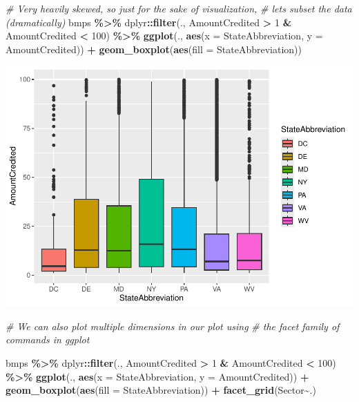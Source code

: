 \documentclass[]{article}
\newenvironment{Shaded}{\begin{snugshade}}{\end{snugshade}}
\newcommand{\AttributeTok}[1]{\textcolor[rgb]{0.13,0.29,0.53}{#1}}
\newcommand{\CommentTok}[1]{\textcolor[rgb]{0.56,0.35,0.01}{\textit{#1}}}
\newcommand{\DecValTok}[1]{\textcolor[rgb]{0.00,0.00,0.81}{#1}}
\newcommand{\FunctionTok}[1]{\textcolor[rgb]{0.13,0.29,0.53}{\textbf{#1}}}
\newcommand{\NormalTok}[1]{#1}
\newcommand{\SpecialCharTok}[1]{\textcolor[rgb]{0.81,0.36,0.00}{\textbf{#1}}}
\begin{document}
\begin{Shaded}
\begin{Highlighting}[]
\CommentTok{\# Very heavily skewed, so just for the sake of visualization, }
\CommentTok{\# let\textquotesingle{}s subset the data (dramatically)}
\NormalTok{bmps }\SpecialCharTok{\%\textgreater{}\%} 
\NormalTok{  dplyr}\SpecialCharTok{::}\FunctionTok{filter}\NormalTok{(., AmountCredited }\SpecialCharTok{\textgreater{}} \DecValTok{1} \SpecialCharTok{\&}\NormalTok{ AmountCredited }\SpecialCharTok{\textless{}} \DecValTok{100}\NormalTok{) }\SpecialCharTok{\%\textgreater{}\%} 
  \FunctionTok{ggplot}\NormalTok{(., }\FunctionTok{aes}\NormalTok{(}\AttributeTok{x =}\NormalTok{ StateAbbreviation, }\AttributeTok{y =}\NormalTok{ AmountCredited)) }\SpecialCharTok{+}
  \FunctionTok{geom\_boxplot}\NormalTok{(}\FunctionTok{aes}\NormalTok{(}\AttributeTok{fill =}\NormalTok{ StateAbbreviation))}
\end{Highlighting}
\end{Shaded}

\includegraphics{lab02_files/figure-latex/review3-2.pdf}

\begin{Shaded}
\begin{Highlighting}[]
\CommentTok{\# We can also plot multiple dimensions in our plot using }
\CommentTok{\# the \textasciigrave{}facet\textasciigrave{} family of commands in ggplot}

\NormalTok{bmps }\SpecialCharTok{\%\textgreater{}\%} 
\NormalTok{  dplyr}\SpecialCharTok{::}\FunctionTok{filter}\NormalTok{(., AmountCredited }\SpecialCharTok{\textgreater{}} \DecValTok{1} \SpecialCharTok{\&}\NormalTok{ AmountCredited }\SpecialCharTok{\textless{}} \DecValTok{100}\NormalTok{) }\SpecialCharTok{\%\textgreater{}\%} 
  \FunctionTok{ggplot}\NormalTok{(., }\FunctionTok{aes}\NormalTok{(}\AttributeTok{x =}\NormalTok{ StateAbbreviation, }\AttributeTok{y =}\NormalTok{ AmountCredited)) }\SpecialCharTok{+}
  \FunctionTok{geom\_boxplot}\NormalTok{(}\FunctionTok{aes}\NormalTok{(}\AttributeTok{fill =}\NormalTok{ StateAbbreviation)) }\SpecialCharTok{+}
  \FunctionTok{facet\_grid}\NormalTok{(Sector}\SpecialCharTok{\textasciitilde{}}\NormalTok{.)}
\end{Highlighting}
\end{Shaded}
\end{document}
